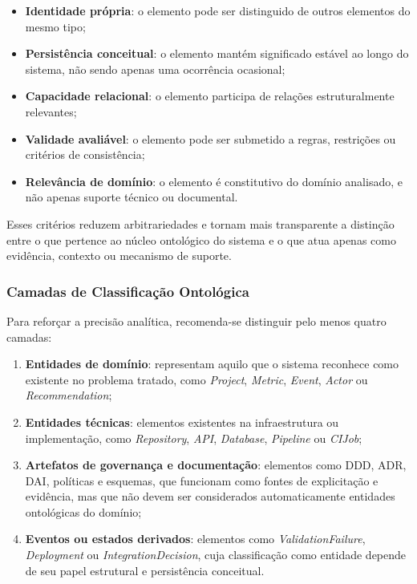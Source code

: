 \documentclass[12pt,a4paper]{article}
\begin{document}
\begin{itemize}
	\item \textbf{Identidade própria}: o elemento pode ser distinguido de outros elementos do mesmo tipo;
	\item \textbf{Persistência conceitual}: o elemento mantém significado estável ao longo do sistema, não sendo apenas uma ocorrência ocasional;
	\item \textbf{Capacidade relacional}: o elemento participa de relações estruturalmente relevantes;
	\item \textbf{Validade avaliável}: o elemento pode ser submetido a regras, restrições ou critérios de consistência;
	\item \textbf{Relevância de domínio}: o elemento é constitutivo do domínio analisado, e não apenas suporte técnico ou documental.
\end{itemize}

Esses critérios reduzem arbitrariedades e tornam mais transparente a distinção entre o que pertence ao núcleo ontológico do sistema e o que atua apenas como evidência, contexto ou mecanismo de suporte.

\subsubsection{Camadas de Classificação Ontológica}

Para reforçar a precisão analítica, recomenda-se distinguir pelo menos quatro camadas:

\begin{enumerate}
	\item \textbf{Entidades de domínio}: representam aquilo que o sistema reconhece como existente no problema tratado, como \textit{Project}, \textit{Metric}, \textit{Event}, \textit{Actor} ou \textit{Recommendation};

	\item \textbf{Entidades técnicas}: elementos existentes na infraestrutura ou implementação, como \textit{Repository}, \textit{API}, \textit{Database}, \textit{Pipeline} ou \textit{CIJob};

	\item \textbf{Artefatos de governança e documentação}: elementos como DDD, ADR, DAI, políticas e esquemas, que funcionam como fontes de explicitação e evidência, mas que não devem ser considerados automaticamente entidades ontológicas do domínio;

	\item \textbf{Eventos ou estados derivados}: elementos como \textit{ValidationFailure}, \textit{Deployment} ou \textit{IntegrationDecision}, cuja classificação como entidade depende de seu papel estrutural e persistência conceitual.
\end{enumerate}
\end{document}

